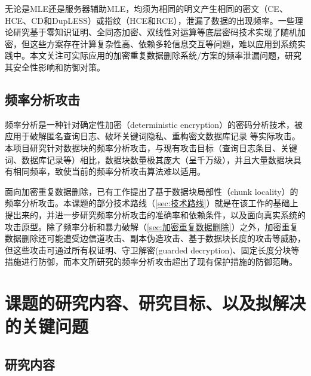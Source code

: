 无论是MLE还是服务器辅助MLE，均须为相同的明文产生相同的密文（CE、HCE、CD和DupLESS）或指纹（HCE和RCE），泄漏了数据的出现频率。一些理论研究基于零知识证明、全同态加密、双线性对运算等底层密码技术实现了随机加密，但这些方案存在计算复杂性高、依赖多轮信息交互等问题，难以应用到系统实践中。本文关注可实际应用的加密重复数据删除系统/方案的频率泄漏问题，研究其安全性影响和防御对策。

\subsection{频率分析攻击}
\label{sec:传统频率分析攻击}

频率分析是一种针对确定性加密（deterministic encryption）的密码分析技术，被应用于破解匿名查询日志、破坏关键词隐私、重构密文数据库记录 等实际攻击。本项目研究针对数据块的频率分析攻击，与现有攻击目标（查询日志条目、关键词、数据库记录等）相比，数据块数量极其庞大（呈千万级），并且大量数据块具有相同频率，致使当前的频率分析攻击算法难以适用。

面向加密重复数据删除，已有工作提出了基于数据块局部性（chunk locality）的频率分析攻击。本课题的部分技术路线（\cref{sec:技术路线}）就是在该工作的基础上提出来的，并进一步研究频率分析攻击的准确率和依赖条件，以及面向真实系统的攻击原型。除了频率分析和暴力破解（\cref{sec:加密重复数据删除}）之外，加密重复数据删除还可能遭受边信道攻击、副本伪造攻击、基于数据块长度的攻击等威胁，但这些攻击可通过所有权证明、守卫解密(guarded decryption)、固定长度分块等措施进行防御，而本文所研究的频率分析攻击超出了现有保护措施的防御范畴。

\section{课题的研究内容、研究目标、以及拟解决的关键问题}
\subsection{研究内容}

